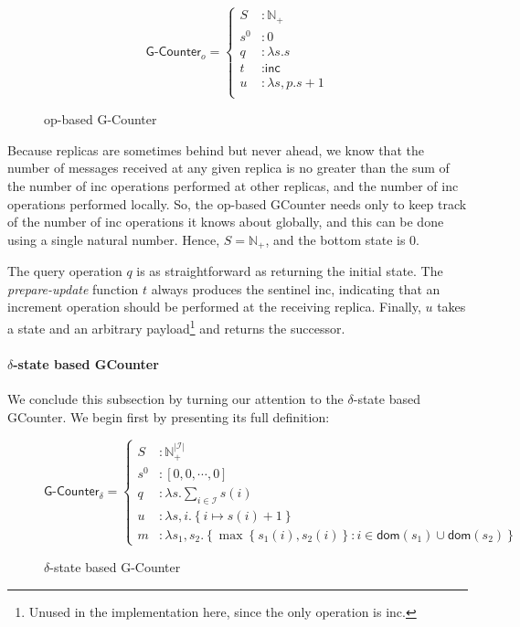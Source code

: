 \begin{figure}[H]
  \centering
  \[
    \textsf{G-Counter}_o = \left\{\begin{aligned}
      S &: \mathbb{N}_+ \\
      s^0 &: 0 \\
      q &: \lambda s. s \\
      t &: \textsf{inc} \\
      u &: \lambda s,p. s + 1 \\
    \end{aligned}\right.
  \]
  \caption{op-based \textsf{G-Counter} \CRDT}
\end{figure}

Because replicas are sometimes behind but never ahead, we know that the number
of messages received at any given replica is no greater than the sum of the
number of \textsf{inc} operations performed at other replicas, and the number of
\textsf{inc} operations performed locally. So, the op-based GCounter needs only
to keep track of the number of \textsf{inc} operations it knows about globally,
and this can be done using a single natural number. Hence, $S = \mathbb{N}_+$,
and the bottom state is $0$.

The query operation $q$ is as straightforward as returning the initial state.
The \emph{prepare-update} function $t$ always produces the sentinel
\textsf{inc}, indicating that an increment operation should be performed at the
receiving replica. Finally, $u$ takes a state and an arbitrary
payload\footnote{Unused in the implementation here, since the only operation is
\textsf{inc}.} and returns the successor.

\paragraph{$\delta$-state based GCounter}
We conclude this subsection by turning our attention to the $\delta$-state based
GCounter. We begin first by presenting its full definition:

\begin{figure}[H]
  \centering
  \[
    \textsf{G-Counter}_\delta = \left\{\begin{aligned}
      S &: \mathbb{N}_+^{|\mathcal{I}|} \\
      s^0 &: \left[ 0, 0, \cdots, 0 \right] \\
      q &: \lambda s. \sum_{i \in \mathcal{I}} s(i) \\
      u &: \lambda s,i. \left\{ i \mapsto s(i) + 1 \right\} \\
      m &: \lambda s_1, s_2. \left\{ \max\left\{ s_1(i), s_2(i) \right\}: i \in \mathsf{dom}(s_1) \cup
      \mathsf{dom}(s_2) \right\}
    \end{aligned}\right.
  \]
  \caption{$\delta$-state based \textsf{G-Counter} \CRDT}
\end{figure}

